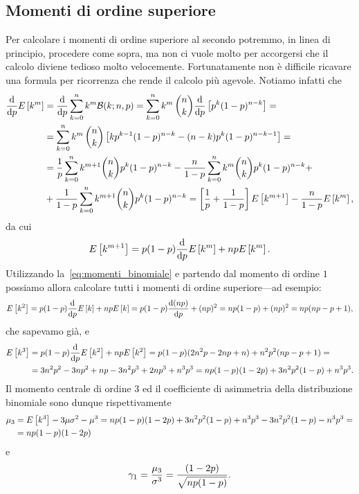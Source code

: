 \filbreak\subsection{Momenti di ordine superiore}

\danger%
Per calcolare i momenti di ordine superiore al secondo potremmo, in linea di
principio, procedere come sopra, ma non ci vuole molto per accorgersi che il
calcolo diviene tedioso molto velocemente. Fortunatamente non è difficile
ricavare una formula per ricorrenza che rende il calcolo più agevole.
Notiamo infatti che
\begin{align*}
  \td{}{p}{}\expect{k^m} & =
  \td{}{p}{}\sum_{k=0}^n k^m\binomialpdf[n, p]{k} =
  \sum_{k=0}^n  k^m\,\binom{n}{k} \td{}{p}{}\left[ p^k (1 - p)^{n-k} \right] =\\
  & = \sum_{k=0}^n  k^m\,\binom{n}{k}
  \left[ k p^{k-1}(1 - p)^{n-k} - (n-k)p^k(1 - p)^{n-k-1} \right] =\\
  & = \frac{1}{p} \sum_{k=0}^n k^{m + 1}\binom{n}{k} p^k (1 - p)^{n-k}
  - \frac{n}{1 -p} \sum_{k=0}^n k^m \binom{n}{k} p^k (1 - p)^{n-k} +\\
  & + \frac{1}{1 -p} \sum_{k=0}^n k^{m+1} \binom{n}{k} p^k (1 - p)^{n-k} =
  \left[\frac{1}{p} + \frac{1}{1-p} \right]\expect{k^{m+1}} -
  \frac{n}{1-p} \expect{k^m},
\end{align*}
da cui
\begin{align}\label{eq:momenti_binomiale}
  \expect{k^{m+1}} = p(1 - p)\td{}{p}{}\expect{k^m} + np\expect{k^m}.
\end{align}
Utilizzando la~\eqref{eq:momenti_binomiale} e partendo dal momento di ordine $1$
possiamo allora calcolare tutti i momenti di ordine superiore---ad esempio:
\begin{align*}
  \expect{k^2} = p(1 - p)\td{}{p}{}\expect{k} + np\expect{k} =
  p(1 - p)\td{(np)}{p}{} + (np)^2 = np(1 - p) + (np)^2 = np(np - p + 1),
\end{align*}
che sapevamo già, e
\begin{align*}
  \expect{k^3} & = p(1 - p)\td{}{p}{}\expect{k^2} + np\expect{k^2} =
  p(1 - p) (2n^2p - 2np + n) + n^2p^2(np - p + 1) =\\
  & = 3n^2p^2 - 3np^2 + np -3n^2p^3 + 2np^3 + n^3p^3 =
  np(1 - p)(1 - 2p) + 3n^2p^2(1 - p) + n^3p^3.
\end{align*}
Il momento centrale di ordine $3$ ed il coefficiente di asimmetria della
distribuzione binomiale sono dunque rispettivamente
\begin{align*}
  \displaystyle \mu_{3} & = \displaystyle E\left[k^3\right] - 3\mu\sigma^2 - \mu^3 =
  np(1 - p)(1 - 2p) + 3n^2p^2(1 - p) + n^3p^3 - 3n^2p^2(1 - p) - n^3p^3 =\\
  & = np(1 - p)(1 - 2p)
\end{align*}
e
\begin{align}
  \displaystyle \gamma_1 = \frac{\displaystyle \mu_{3}}{\sigma^3} = \frac{(1 - 2p)}{\sqrt{np(1 - p)}}.
\end{align}


